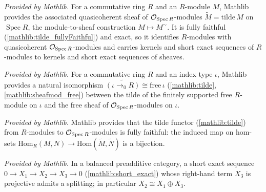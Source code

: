 \begin{definition}
  \label{mathlib:tilde}
  \mathlibok
  \textit{Provided by Mathlib.}
  For a commutative ring \(R\) and an \(R\)-module \(M\), Mathlib provides the
  associated quasicoherent sheaf of \(\mathcal{O}_{\operatorname{Spec}R}\)-modules
  \(\widetilde M=\mathrm{tilde}\,M\) on \(\operatorname{Spec}R\), the
  module-to-sheaf construction \(M\mapsto M^{\sim}\).  It is fully faithful
  (\cref{mathlib:tilde_fullyFaithful}) and exact, so it identifies \(R\)-modules
  with quasicoherent \(\mathcal{O}_{\operatorname{Spec}R}\)-modules and carries kernels and
  short exact sequences of \(R\)-modules to kernels and short exact sequences of
  sheaves.
\end{definition}

\begin{lemma}
  \label{mathlib:tildeFinsupp}
  \mathlibok
  \textit{Provided by Mathlib.}
  For a commutative ring \(R\) and an index type \(\iota\), Mathlib provides a
  natural isomorphism \(\widetilde{(\iota\to_0 R)}\cong\mathrm{free}\,\iota\)
  (\cref{mathlib:tilde}, \cref{mathlib:sheafmod_free}) between the tilde of the
  finitely supported free \(R\)-module on \(\iota\) and the free sheaf of
  \(\mathcal{O}_{\operatorname{Spec}R}\)-modules on \(\iota\).
\end{lemma}

\begin{lemma}
  \label{mathlib:tilde_fullyFaithful}
  \mathlibok
  \textit{Provided by Mathlib.}
  Mathlib provides that the tilde functor (\cref{mathlib:tilde}) from
  \(R\)-modules to \(\mathcal{O}_{\operatorname{Spec}R}\)-modules is fully faithful: the
  induced map on hom-sets
  \(\mathrm{Hom}_R(M,N)\to\mathrm{Hom}(\widetilde M,\widetilde N)\) is a bijection.
\end{lemma}

\begin{lemma}
  \label{mathlib:splittingOfProjective}
  \mathlibok
  \textit{Provided by Mathlib.}
  In a balanced preadditive category, a short exact sequence
  \(0\to X_1\to X_2\to X_3\to 0\) (\cref{mathlib:short_exact}) whose right-hand
  term \(X_3\) is projective admits a splitting; in particular
  \(X_2\cong X_1\oplus X_3\).
\end{lemma}

